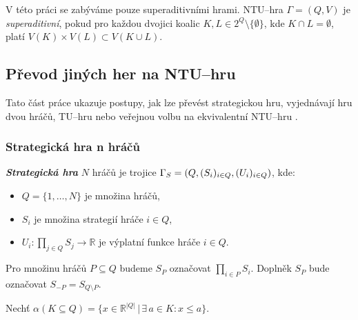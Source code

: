         V této práci se zabýváme pouze superaditivními hrami. NTU--hra $\Gamma = (Q, V)$ je \textit{superaditivní}, pokud pro každou dvojici koalic $K, L \in 2^Q \setminus \{\emptyset\}$, kde $K \cap L = \emptyset$, platí $V(K) \times V(L) \subset V(K \cup L)$.

    \subsection{Převod jiných her na NTU--hru}
        Tato část práce ukazuje postupy, jak lze převést strategickou hru, vyjednávají hru dvou hráčů, TU--hru nebo veřejnou volbu na ekvivalentní NTU--hru \cite{Game_Theory}.

        \subsubsection*{Strategická hra n hráčů}
            \textit{\textbf{Strategická hra}} $N$ hráčů \cite{Hruby2022NCOOP} je trojice $\Gamma_S = (Q, (S_i)_{i\in Q},\\ (U_i)_{i\in Q})$, kde:
            \begin{itemize}
                \item $Q = \{1, \dots, N\}$ je množina hráčů,
                \item $S_i$ je množina strategií hráče $i \in Q$,
                \item $U_i: \prod_{j\in Q}S_j \rightarrow \mathbb{R}$ je výplatní funkce hráče $i \in Q$.
            \end{itemize}

            Pro množinu hráčů $P \subseteq Q$ budeme $S_P$ označovat $\prod_{i \in P}S_i$. Doplněk $S_P$ bude označovat $S_{-P} = S_{Q\setminus P}$.

            Nechť $\alpha(K \subseteq Q) = \{x \in \mathbb{R}^{|Q|}\,|\, \exists\, a \in K:  x \leqslant a\}$.

